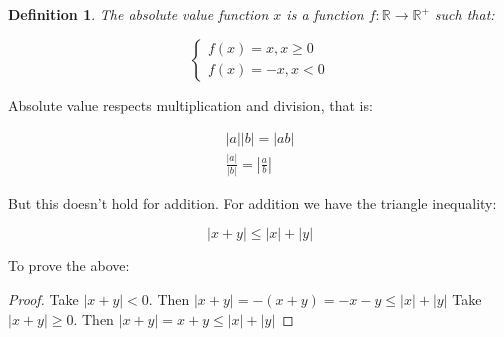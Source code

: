 \documentclass{article}
\newtheorem{definition}{Definition}
\begin{document}
\begin{definition}
The absolute value function $x$ is a function $f: \mathbb{R} \to \mathbb{R^{+}}$ such that:

\[ \begin{cases}  
      f(x) = x , x \geq 0 \\
      f(x) = - x , x < 0
   \end{cases}
\]
\end{definition}

Absolute value respects multiplication and division, that is:

\begin{align*}
    |a||b| = |ab|\\
    \frac{|a|}{|b|} = |\frac{a}{b}|
\end{align*}

But this doesn't hold for addition. For addition we have the triangle inequality: 

\begin{equation*}
    |x+y| \leq |x| + |y| 
\end{equation*}

To prove the above: 


\begin{proof}
Take $|x+y| < 0$. Then $|x+y| = -(x+y) = -x -y \leq |x| + |y|$ Take $|x+y| \geq 0$. Then $|x+y| = x + y \leq |x| + |y|$
    \tag*{\qedhere}
\end{proof}
\end{document}
